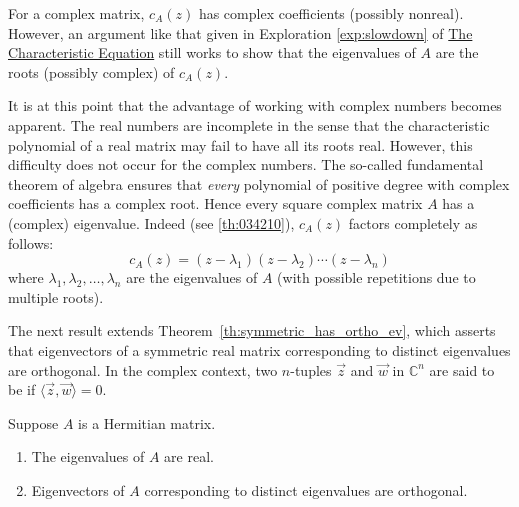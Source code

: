 \documentclass{ximera}
\begin{document}
For a complex matrix, $c_{A}(z)$ has complex coefficients (possibly nonreal). However, an argument like that given in Exploration \ref{exp:slowdown} of \href{https://ximera.osu.edu/oerlinalg/LinearAlgebra/EIG-0020/main}{The Characteristic Equation} still works to show that the eigenvalues of $A$ are the roots (possibly complex) of $c_{A}(z)$.


It is at this point that the advantage
of working with complex numbers becomes apparent. The real numbers are
incomplete in the sense that the characteristic polynomial of a real
matrix may fail to have all its roots real. However, this difficulty
does not occur for the complex numbers. The so-called fundamental
theorem of algebra ensures that \textit{every} polynomial of positive degree with complex coefficients has a complex root. Hence every square complex matrix $A$ has a (complex) eigenvalue. Indeed (see \ref{th:034210}), $c_{A}(z)$ factors completely as follows:
\begin{equation*}
c_{A}(z) = (z -\lambda_{1})(z -\lambda_{2}) \cdots (z -\lambda_{n})
\end{equation*}
where $\lambda_{1}, \lambda_{2}, \ldots, \lambda_{n}$ are the eigenvalues of $A$ (with possible repetitions due to multiple roots).

The next result extends Theorem~\ref{th:symmetric_has_ortho_ev},
 which asserts that eigenvectors of a symmetric real matrix
corresponding to distinct eigenvalues are orthogonal. In the
complex context, two $n$-tuples $\vec{z}$ and $\vec{w}$ in $\mathbb{C}^n$ are said to be  if $\langle \vec{z}, \vec{w} \rangle = 0$.

\begin{theorem}\label{th:025729}
Suppose $A$ is a Hermitian matrix.

\begin{enumerate}
\item\label{th:025729a} The eigenvalues of $A$ are real.

\item\label{th:025729b} Eigenvectors of $A$ corresponding to distinct eigenvalues are orthogonal.

\end{enumerate}
\end{theorem}
\end{document}
